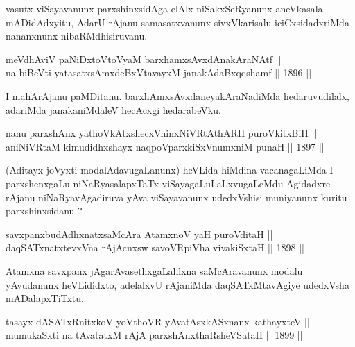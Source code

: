\begin{artha}
vasutx viSayavanunx parxshinxsidAga elAlx niSakxSeRyanunx aneVkasala
mADidAdxyitu, AdarU rAjanu samasatxvanunx sivxVkarisalu
iciCxsidadxriMda nananxnunx nibaRMdhisiruvanu.
\end{artha}

\begin{shl}
meVdhAviV paNiDxtoV\s toV\s yaM barxhamxsAvxdAnakAraNAtf || \\
na biBeVti yatasatxsAmxdeBxVtavayxM janakAdaBxqqshamf ||  1896 ||  
\end{shl}

\begin{artha}
I mahArAjanu paMDitanu. barxhAmxsAvxdaneyakAraNadiMda hedaruvudilalx,
adariMda janakaniMdaleV hecAcxgi hedarabeVku.
\end{artha}


\begin{shl}
nanu parxshAnx yathoVkAtxshecxVninxNiVRtAthARH puroVkitxBiH || \\
aniNiVRtaM kimudidhxshayx naqpoV\s parxkiSxVnumxniM punaH ||  1897 ||  
\end{shl} 

\begin{artha}
(Aditayx joVyxti modalAdavugaLanunx) heVLida hiMdina vacanagaLiMda I
parxshenxgaLu niNaRyasalapxTaTx viSayagaLuLaLxvugaLeMdu Agidadxre
rAjanu niNaRyavAgadiruva yAva viSayavanunx udedxVshisi muniyanunx
kuritu parxshinxsidanu ?
\end{artha}


\begin{shl}
savxpanxbudAdhxnatxsaMcAra AtamxnoV yaH puroVditaH || \\
daqSATxnatxtevxVna rAjAcnx\s sw savoVR\s piVha vivakiSxtaH ||  1898 ||  
\end{shl}

\begin{artha}
Atamxna savxpanx jAgarAvasethxgaLalilxna saMcAravanunx modalu
yAvudanunx heVLididxto, adelalxvU rAjaniMda daqSATxMtavAgiye udedxVsha
mADalapxTiTxtu.
\end{artha}


\begin{shl}
tasayx dASATxRnitxkoV yoV\s thoVR yAvatAsxkASxnanx kathayxteV || \\
mumukaSxti na tAvatatxM rAjA parxshAnxthaRsheVSataH ||  1899 ||  
\end{shl}

